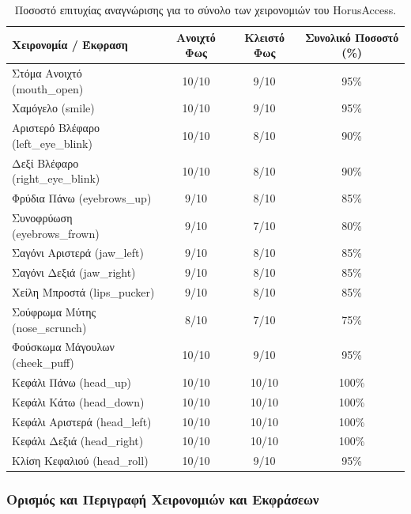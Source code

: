 \documentclass[twoside, a4paper, 11pt]{article}
\newcommand{\textlatin}[1]{\textenglish{#1}}
\begin{document}
\begin{table}[htbp]
    \centering
    \caption{Ποσοστό επιτυχίας αναγνώρισης για το σύνολο των χειρονομιών του \textlatin{HorusAccess}.}
    \label{tab:gesture_success_rate}
    \begin{tabular}{|l|c|c|c|}
        \hline
        \textbf{Χειρονομία / Έκφραση} & \textbf{Ανοιχτό Φως} & \textbf{Κλειστό Φως} & \textbf{Συνολικό Ποσοστό (\%)} \\
        \hline
        Στόμα Ανοιχτό (\textlatin{mouth\_open}) & 10/10 & 9/10 & 95\% \\
        Χαμόγελο (\textlatin{smile}) & 10/10 & 9/10 & 95\% \\
        Αριστερό Βλέφαρο (\textlatin{left\_eye\_blink}) & 10/10 & 8/10 & 90\% \\
        Δεξί Βλέφαρο (\textlatin{right\_eye\_blink}) & 10/10 & 8/10 & 90\% \\
        Φρύδια Πάνω (\textlatin{eyebrows\_up}) & 9/10 & 8/10 & 85\% \\
        Συνοφρύωση (\textlatin{eyebrows\_frown}) & 9/10 & 7/10 & 80\% \\
        Σαγόνι Αριστερά (\textlatin{jaw\_left}) & 9/10 & 8/10 & 85\% \\
        Σαγόνι Δεξιά (\textlatin{jaw\_right}) & 9/10 & 8/10 & 85\% \\
        Χείλη Μπροστά (\textlatin{lips\_pucker}) & 9/10 & 8/10 & 85\% \\
        Σούφρωμα Μύτης (\textlatin{nose\_scrunch}) & 8/10 & 7/10 & 75\% \\
        Φούσκωμα Μάγουλων (\textlatin{cheek\_puff}) & 10/10 & 9/10 & 95\% \\
        Κεφάλι Πάνω (\textlatin{head\_up}) & 10/10 & 10/10 & 100\% \\
        Κεφάλι Κάτω (\textlatin{head\_down}) & 10/10 & 10/10 & 100\% \\
        Κεφάλι Αριστερά (\textlatin{head\_left}) & 10/10 & 10/10 & 100\% \\
        Κεφάλι Δεξιά (\textlatin{head\_right}) & 10/10 & 10/10 & 100\% \\
        Κλίση Κεφαλιού (\textlatin{head\_roll}) & 10/10 & 9/10 & 95\% \\
        \hline
    \end{tabular}
\end{table}

\subsubsection{Ορισμός και Περιγραφή Χειρονομιών και Εκφράσεων}
\end{document}
